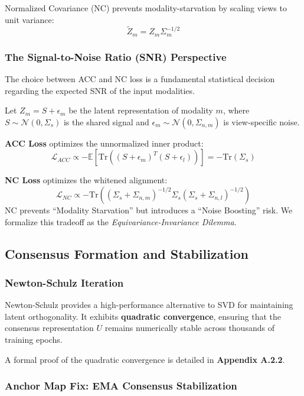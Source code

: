 \documentclass[
  letterpaper,
]{report}
\begin{document}
Normalized Covariance (NC) prevents modality-starvation by scaling views
to unit variance: \[ \tilde{Z}_m = Z_m \Sigma_m^{-1/2} \]

\subsubsection{The Signal-to-Noise Ratio (SNR)
Perspective}\label{the-signal-to-noise-ratio-snr-perspective}

The choice between ACC and NC loss is a fundamental statistical decision
regarding the expected SNR of the input modalities.

Let \(Z_m = S + \epsilon_m\) be the latent representation of modality
\(m\), where \(S \sim \mathcal{N}(0, \Sigma_s)\) is the shared signal
and \(\epsilon_m \sim \mathcal{N}(0, \Sigma_{n,m})\) is view-specific
noise.

\textbf{ACC Loss} optimizes the unnormalized inner product:
\[ \mathcal{L}_{ACC} \propto - \mathbb{E}[\text{Tr}((S + \epsilon_m)^T (S + \epsilon_l))] = - \text{Tr}(\Sigma_s) \]

\textbf{NC Loss} optimizes the whitened alignment:
\[ \mathcal{L}_{NC} \propto - \text{Tr}\left( (\Sigma_s + \Sigma_{n,m})^{-1/2} \Sigma_s (\Sigma_s + \Sigma_{n,l})^{-1/2} \right) \]
NC prevents ``Modality Starvation'' but introduces a ``Noise Boosting''
risk. We formalize this tradeoff as the \emph{Equivariance-Invariance
Dilemma}.

\subsection{Consensus Formation and
Stabilization}\label{consensus-formation-and-stabilization}

\subsubsection{Newton-Schulz Iteration}\label{newton-schulz-iteration}

Newton-Schulz provides a high-performance alternative to SVD for
maintaining latent orthogonality. It exhibits \textbf{quadratic
convergence}, ensuring that the consensus representation \(U\) remains
numerically stable across thousands of training epochs.

A formal proof of the quadratic convergence is detailed in
\textbf{Appendix A.2.2}.

\subsubsection{Anchor Map Fix: EMA Consensus
Stabilization}\label{anchor-map-fix-ema-consensus-stabilization}
\end{document}
